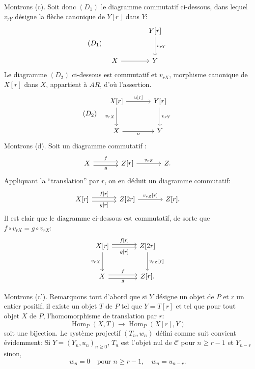 \documentclass[11pt]{article}
\DeclareMathOperator{\Hom}{Hom}
\providecommand{\Hom}{\operatorname{Hom}}
\providecommand{\cC}{\mathcal C}
\providecommand{\cC}{\mathcal C}
\providecommand{\Hom}{\operatorname{Hom}}
\begin{document}
Montrons (c). Soit donc $(D_1)$ le diagramme commutatif ci-dessous, dans lequel $v_{rY}$ désigne la flèche canonique de $Y[r]$ dans $Y$:
\[
(D_1)\quad
\begin{tikzcd}[column sep=large,row sep=large]
& Y[r] \arrow[d,"{v_{rY}}"]\\
X \arrow[r] & Y
\end{tikzcd}
\]
Le diagramme $(D_2)$ ci-dessous est commutatif et $v_{rX}$, morphisme canonique de $X[r]$ dans $X$, appartient à $AR$, d'où l'assertion.
\[
(D_2)\quad
\begin{tikzcd}[column sep=large,row sep=large]
X[r] \arrow[r,"{u[r]}"] \arrow[d,"{v_{rX}}"'] & Y[r] \arrow[d,"{v_{rY}}"]\\
X \arrow[r,"u"'] & Y
\end{tikzcd}
\]
Montrons (d). Soit un diagramme commutatif :
\[
\begin{tikzcd}[column sep=large]
X \arrow[r,shift left,"f"] \arrow[r,shift right,"g"'] & Z[r] \arrow[r,"{v_{rZ}}"] & Z .
\end{tikzcd}
\]
Appliquant la ``translation'' par $r$, on en déduit un diagramme commutatif:
\[
\begin{tikzcd}[column sep=large]
X[r] \arrow[r,shift left,"{f[r]}"] \arrow[r,shift right,"{g[r]}"'] & Z[2r] \arrow[r,"{v_{rZ}[r]}"] & Z[r].
\end{tikzcd}
\]
Il est clair que le diagramme ci-dessous est commutatif, de sorte que $f\circ v_{rX}=g\circ v_{rX}$:
\[
\begin{tikzcd}[column sep=large,row sep=large]
X[r] \arrow[r,shift left,"{f[r]}"] \arrow[r,shift right,"{g[r]}"'] \arrow[d,"{v_{rX}}"'] & Z[2r] \arrow[d,"{v_{rZ}[r]}"]\\
X \arrow[r,shift left,"f"] \arrow[r,shift right,"g"'] & Z[r] .
\end{tikzcd}
\]

Montrons (c'). Remarquons tout d'abord que si $Y$ désigne un objet de $P$ et $r$ un entier positif, il existe un objet $T$ de $P$ tel que $Y=T[r]$ et tel que pour tout objet $X$ de $P$, l'homomorphisme de translation par $r$:
\[
\Hom_P(X,T)\longrightarrow\Hom_P(X[r],Y)
\]
soit une bijection. Le système projectif $(T_n,w_n)$ défini comme suit convient évidemment:
Si $Y=(Y_n,u_n)_{n\ge 0}$, $T_n$ est l'objet nul de $\cC$ pour $n\ge r-1$ et $Y_{n-r}$ sinon,
\[
w_n=0\quad\text{pour } n\ge r-1,\quad w_n=u_{n-r}.
\]
\end{document}
